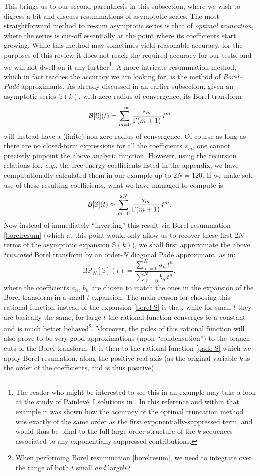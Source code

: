 \documentclass[11pt,a4paper]{article}
\newcommand{\CB}{{\cal B}}
\def\BS{{\mathbb S}}
\newcommand{\be}{\begin{equation}}
\newcommand{\ee}{\end{equation}}
\begin{document}
This brings us to our second parenthesis in this subsection, where we wish to digress a bit and discuss resummations of asymptotic series. The most straightforward method to re-sum asymptotic series is that of \textit{optimal truncation}, where the series is cut-off essentially at the point where its coefficients start growing. While this method may sometimes yield reasonable accuracy, for the purposes of this review it does not reach the required accuracy for our tests, and we will not dwell on it any further\footnote{The reader who might be interested to see this in an example may take a look at the study of Painlev\'e~I solutions in \cite{asv11}. In this reference and within that example it was shown how the accuracy of the optimal truncation method was exactly of the same order as the first exponentially-suppressed term, and would thus be blind to the full large-order structure of the $k$-sequences associated to any exponentially suppressed contributions.}. A more intricate resummation method, which in fact reaches the accuracy we are looking for, is the method of \textit{Borel--Pad\'e} approximants. As already discussed in an earlier subsection, given an asymptotic series $\BS(k)$, with zero radius of convergence, its Borel transform
%
\be
\CB [\BS] (t) = \sum_{m=0}^{+\infty} \frac{s_m}{\Gamma(m+1)}\, t^m
\ee
%
\noindent
will instead have a (finite) non-zero radius of convergence. Of course as long as there are no closed-form expressions for all the coefficients $s_m$, one cannot precisely pinpoint the above analytic function. However, using the recursion relations for, \textit{e.g.}, the free energy coefficients listed in the appendix, we have computationally calculated them in our example up to $2N=120$. If we make sole use of these resulting coefficients, what we have managed to compute is
%
\be
\label{borel-S}
\CB [\BS] (t) \approx \sum_{m=0}^{2N} \frac{s_m}{\Gamma(m+1)}\, t^m.
\ee
%
\noindent
Now instead of immediately ``inverting'' this result via Borel resummation \eqref{borelresum} (which at this point would only allow us to recover these first $2N$ terms of the asymptotic expansion $\BS(k)$), we shall first approximate the above \textit{truncated} Borel transform by an order-$N$ diagonal Pad\'e approximant, as in:
%
\be
\label{pade-S}
\mathrm{BP}_N [\BS] (t) = \frac{\sum_{\ell=0}^{N} a_n\, t^n}{\sum_{\ell=0}^{N} b_n\, t^n},
\ee
%
\noindent
where the coefficients $a_n$, $b_n$ are chosen to match the ones in the expansion of the Borel transform in a small-$t$ expansion. The main reason for choosing this rational function instead of the expansion \eqref{borel-S} is that, while for small $t$ they are basically the same, for large $t$ the rational function converges to a constant and is much better behaved\footnote{When performing Borel resummation \eqref{borelresum}, we need to integrate over the range of both $t$ small \textit{and} large!}. Moreover, the poles of this rational function will also prove to be very good approximations (upon ``condensation'') to the branch-cuts of the Borel transform. It is then to the rational function \eqref{pade-S} which we apply Borel resumation, along the positive real axis (as the original variable $k$ is the order of the coefficients, and is thus positive),
\end{document}
